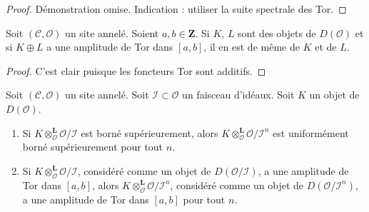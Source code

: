 \begin{proof}
Démonstration omise. Indication : utiliser la suite spectrale des Tor.
\end{proof}

\begin{lemma}
\label{lemma-summands-tor-amplitude}
Soit $(\mathcal{C}, \mathcal{O})$ un site annelé. Soient
$a, b \in \mathbf{Z}$. Si $K$, $L$ sont des objets de $D(\mathcal{O})$ et si
$K \oplus L$ a une amplitude de Tor dans $[a, b]$, il en est de même de $K$
et de $L$.
\end{lemma}

\begin{proof}
C'est clair puisque les foncteurs Tor sont additifs.
\end{proof}

\begin{lemma}
\label{lemma-bounded}
Soit $(\mathcal{C}, \mathcal{O})$ un site annelé. Soit
$\mathcal{I} \subset \mathcal{O}$ un faisceau d'idéaux. Soit $K$ un objet
de $D(\mathcal{O})$.
\begin{enumerate}
\item Si $K \otimes_\mathcal{O}^\mathbf{L} \mathcal{O}/\mathcal{I}$ est
borné supérieurement, alors
$K \otimes_\mathcal{O}^\mathbf{L} \mathcal{O}/\mathcal{I}^n$
est uniformément borné supérieurement pour tout $n$.
\item Si $K \otimes_\mathcal{O}^\mathbf{L} \mathcal{O}/\mathcal{I}$,
considéré comme un objet de $D(\mathcal{O}/\mathcal{I})$, a une amplitude de
Tor dans $[a, b]$, alors
$K \otimes_\mathcal{O}^\mathbf{L} \mathcal{O}/\mathcal{I}^n$, considéré
comme un objet de $D(\mathcal{O}/\mathcal{I}^n)$, a une amplitude de Tor dans
$[a, b]$ pour tout $n$.
\end{enumerate}
\end{lemma}


